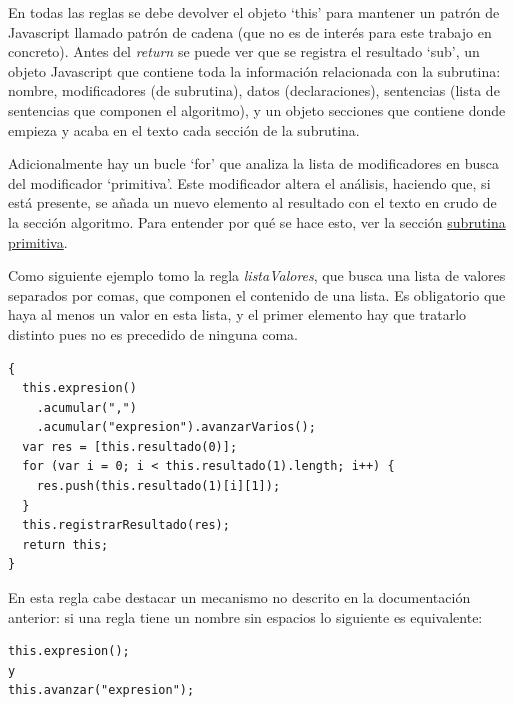 \documentclass{report}
\begin{document}
	\vspace{10px}
	
	En todas las reglas se debe devolver el objeto `this' para mantener un patrón de Javascript llamado patrón de cadena (que no es de interés para este trabajo en concreto). Antes del \textit{return} se puede ver que se registra el resultado `sub', un objeto Javascript que contiene toda la información relacionada con la subrutina: nombre, modificadores (de subrutina), datos (declaraciones), sentencias (lista de sentencias que componen el algoritmo), y un objeto secciones que contiene donde empieza y acaba en el texto cada sección de la subrutina. 
	
	\vspace{10px}
	
	Adicionalmente hay un bucle `for' que analiza la lista de modificadores en busca del modificador `primitiva'. Este modificador altera el análisis, haciendo que, si está presente, se añada un nuevo elemento al resultado con el texto en crudo de la sección algoritmo. Para entender por qué se hace esto, ver la sección \hyperref[subrutinasprimitivas]{subrutina primitiva}.
	
	\vspace{10px}
	
	Como siguiente ejemplo tomo la regla \textit{listaValores}, que busca una lista de valores separados por comas, que componen el contenido de una lista. Es obligatorio que haya al menos un valor en esta lista, y el primer elemento hay que tratarlo distinto pues no es precedido de ninguna coma.
	
\begin{BVerbatim}
{
  this.expresion()
    .acumular(",")
    .acumular("expresion").avanzarVarios();
  var res = [this.resultado(0)];
  for (var i = 0; i < this.resultado(1).length; i++) {
    res.push(this.resultado(1)[i][1]);
  }
  this.registrarResultado(res);
  return this;
}
\end{BVerbatim}

	\vspace{10px}

	En esta regla cabe destacar un mecanismo no descrito en la documentación anterior: si una regla tiene un nombre sin espacios lo siguiente es equivalente:
	
\begin{BVerbatim}
this.expresion();
y
this.avanzar("expresion");
\end{BVerbatim}	

	\vspace{10px}
\end{document}
